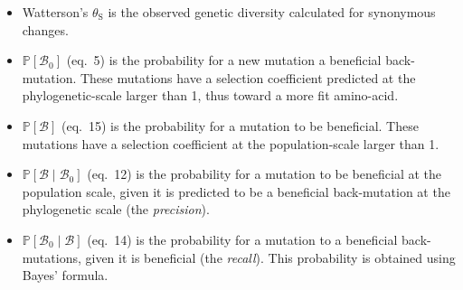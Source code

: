 \documentclass{article}
\newcommand{\proba}{\mathbb{P}}
\newcommand{\SphyBen}{\mathcal{B}_0}
\newcommand{\given}{\mid}
\newcommand{\SpopBen}{\mathcal{B}}
\newcommand{\thetaSyn}{\theta_{\text{S}}}
\begin{document}
    \begin{itemize}
        \item Watterson's $\thetaSyn$ is the observed genetic diversity calculated for synonymous changes.
        \item $\proba [ \SphyBen ]$ (eq.~5) is the probability for a new mutation a beneficial back-mutation.
        These mutations have a selection coefficient predicted at the phylogenetic-scale larger than 1, thus toward a more fit amino-acid.
        \item $\proba [ \SpopBen ]$ (eq.~15) is the probability for a mutation to be beneficial.
        These mutations have a selection coefficient at the population-scale larger than 1.
        \item $\proba [ \SpopBen \given \SphyBen]$ (eq.~12) is the probability for a mutation to be beneficial at the population scale, given it is predicted to be a beneficial back-mutation at the phylogenetic scale (the \textit{precision}).
        \item $\proba [ \SphyBen \given \SpopBen]$ (eq.~14) is the probability for a mutation to a beneficial back-mutations, given it is beneficial (the \textit{recall}).
        This probability is obtained using Bayes' formula.
    \end{itemize}
    \newpage
\end{document}

